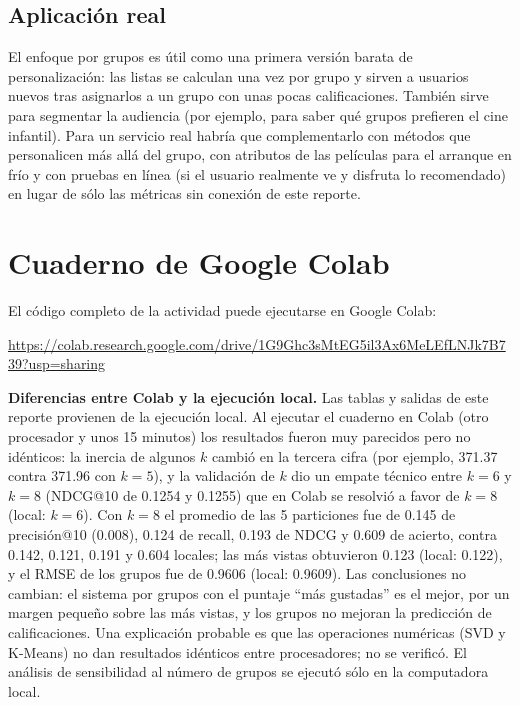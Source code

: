 \documentclass[11pt,letterpaper]{article}
\begin{document}
\subsection{Aplicación real}

El enfoque por grupos es útil como una primera versión barata de personalización: las listas se calculan una vez por grupo y sirven a usuarios nuevos tras asignarlos a un grupo con unas pocas calificaciones. También sirve para segmentar la audiencia (por ejemplo, para saber qué grupos prefieren el cine infantil). Para un servicio real habría que complementarlo con métodos que personalicen más allá del grupo, con atributos de las películas para el arranque en frío y con pruebas en línea (si el usuario realmente ve y disfruta lo recomendado) en lugar de sólo las métricas sin conexión de este reporte.

\section{Cuaderno de Google Colab}

El código completo de la actividad puede ejecutarse en Google Colab:

\begin{center}
    \url{https://colab.research.google.com/drive/1G9Ghc3sMtEG5il3Ax6MeLEfLNJk7B739?usp=sharing}
\end{center}

\textbf{Diferencias entre Colab y la ejecución local.} Las tablas y salidas de este reporte provienen de la ejecución local. Al ejecutar el cuaderno en Colab (otro procesador y unos 15 minutos) los resultados fueron muy parecidos pero no idénticos: la inercia de algunos $k$ cambió en la tercera cifra (por ejemplo, 371.37 contra 371.96 con $k=5$), y la validación de $k$ dio un empate técnico entre $k=6$ y $k=8$ (NDCG@10 de 0.1254 y 0.1255) que en Colab se resolvió a favor de $k=8$ (local: $k=6$). Con $k=8$ el promedio de las 5 particiones fue de 0.145 de precisión@10 (0.008), 0.124 de recall, 0.193 de NDCG y 0.609 de acierto, contra 0.142, 0.121, 0.191 y 0.604 locales; las más vistas obtuvieron 0.123 (local: 0.122), y el RMSE de los grupos fue de 0.9606 (local: 0.9609). Las conclusiones no cambian: el sistema por grupos con el puntaje ``más gustadas'' es el mejor, por un margen pequeño sobre las más vistas, y los grupos no mejoran la predicción de calificaciones. Una explicación probable es que las operaciones numéricas (SVD y K-Means) no dan resultados idénticos entre procesadores; no se verificó. El análisis de sensibilidad al número de grupos se ejecutó sólo en la computadora local.
\end{document}
